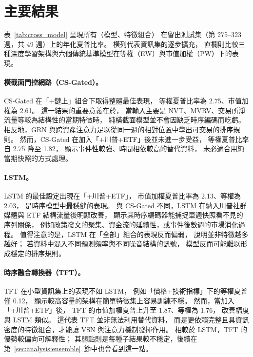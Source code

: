 
\section{主要結果}

表~\ref{tab:cross_model} 呈現所有（模型、特徵組合）
在留出測試集（第 275--323 週，共 49 週）上的年化夏普比率。
橫列代表資訊集的逐步擴充，
直欄則比較三種深度學習架構與六個傳統基準模型在等權（EW）與市值加權（PW）下的表現。



\paragraph{橫截面門控網路（CS-Gated）。}
CS-Gated 在「+鏈上」組合下取得整體最佳表現，
等權夏普比率為 2.75、市值加權為 2.61。
這一結果的重要意義在於，
當輸入主要是 NVT、MVRV、交易所淨流量等較為結構性的當期特徵時，
純橫截面模型並不會因缺乏時序編碼而吃虧。
相反地，GRN 與跨資產注意力足以從同一週的相對位置中學出可交易的排序規則。
然而，CS-Gated 在加入「+川普+ETF」後並未進一步受益，
等權夏普比率自 2.75 降至 1.82，
顯示事件性較強、時間相依較高的替代資料，
未必適合用純當期快照的方式處理。

\paragraph{LSTM。}
LSTM 的最佳設定出現在「+川普+ETF」，
市值加權夏普比率為 2.13、等權為 2.03，
是時序模型中最穩健的表現。
與 CS-Gated 不同，LSTM 在納入川普社群媒體與 ETF 結構流量後明顯改善，
顯示其時序編碼器能捕捉單週快照看不見的序列關係，
例如政策發文的聚集、資金流的延續性，或事件後數週的市場消化過程。
值得注意的是，LSTM 在「全部」組合的表現反而偏弱，
說明並非特徵越多越好；
若資料中混入不同預測頻率與不同噪音結構的訊號，
模型反而可能難以形成穩定的排序規則。

\paragraph{時序融合轉換器（TFT）。}
TFT 在小型資訊集上的表現不如 LSTM，
例如「價格+技術指標」下的等權夏普僅 0.12，
顯示較高容量的架構在簡單特徵集上容易訓練不穩。
然而，當加入「+川普+ETF」後，
TFT 的市值加權夏普上升至 1.87、等權為 1.76，
改善幅度與 LSTM 類似。
這代表 TFT 並非無法利用替代資料，
而是更依賴完整且具資訊密度的特徵組合，才能讓 VSN 與注意力機制發揮作用。
相較於 LSTM，TFT 的優勢較偏向可解釋性；
其弱點則是每種子結果較不穩定，後續在第~\ref{sec:analysis:ensemble}~節中也會看到這一點。

